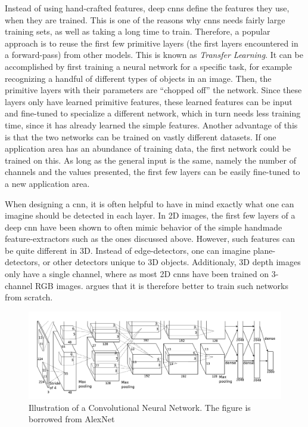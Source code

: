 Instead of using hand-crafted features, deep \gls{cnn}s define the features they use, when they are trained. This is one of the reasons why \gls{cnn}s needs fairly large training sets, as well as taking a long time to train. Therefore, a popular approach is to reuse the first few primitive layers (the first layers encountered in a forward-pass) from other models. This is known as \emph{Transfer Learning}. It can be accomplished by first training a neural network for a specific task, for example recognizing a handful of different types of objects in an image. Then, the primitive layers with their parameters are ``chopped off'' the network. Since these layers only have learned primitive features, these learned features can be input and fine-tuned to specialize a different network, which in turn needs less training time, since it has already learned the simple features. Another advantage of this is that the two networks can be trained on vastly different datasets. If one application area has an abundance of training data, the first network could be trained on this. As long as the general input is the same, namely the number of channels and the values presented, the first few layers can be easily fine-tuned to a new application area.

When designing a \gls{cnn}, it is often helpful to have in mind exactly what one can imagine should be detected in each layer. In 2D images, the first few layers of a deep \gls{cnn} have been shown to often mimic behavior of the simple handmade feature-extractors such as the ones discussed above. However, such features can be quite different in 3D. Instead of edge-detectors, one can imagine plane-detectors, or other detectors unique to 3D objects. Additionaly, 3D depth images only have a single channel, where as most 2D \gls{cnn}s have been trained on 3-channel RGB images. \cite{song2018depth} argues that it is therefore better to train such networks from scratch.

\begin{figure}[h]
  \centering
  \includegraphics[width=\textwidth]{img/alexnet}
  \caption[AlexNet]{Illustration of a Convolutional Neural Network. The figure is borrowed from AlexNet~\cite{alexnet2012}}
  \label{fig:alexnet}
\end{figure}

